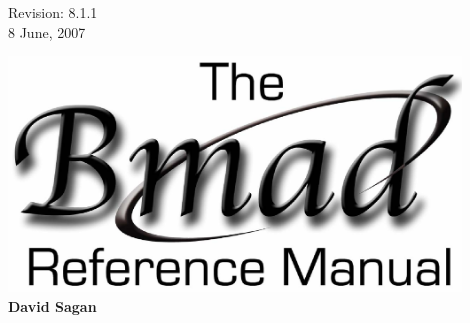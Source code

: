 \thispagestyle{empty}

\begin{flushright}
\large
  Revision: 8.1.1 \\
  8 June, 2007 \\
\end{flushright}

\vfill

{
\begin{center}
\includegraphics[width=12cm]{bmad-ref-manual.eps} \\
\vskip 0.3in
\huge\bf David Sagan
\end{center}
}

\vfill
\break

